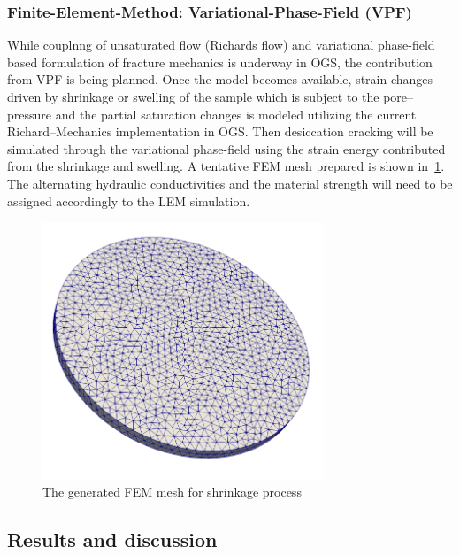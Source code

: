 

\subsubsection*{Finite-Element-Method: Variational-Phase-Field (VPF)}
While couplnng of unsaturated flow (Richards flow) and variational phase-field based formulation of fracture mechanics is underway in OGS, the contribution from VPF is being planned. 
Once the model becomes available, strain changes driven by shrinkage or swelling of the sample which is subject to the pore--pressure and the partial saturation changes is modeled utilizing the current Richard--Mechanics implementation in OGS. Then desiccation cracking will be simulated through the variational phase-field using the strain energy contributed from the shrinkage and swelling.
A tentative FEM mesh prepared is shown in~\ref{fig:ME5_VPF_setup}.
The alternating hydraulic conductivities and the material strength will need to be assigned accordingly to the LEM simulation.

\begin{figure}[!ht]
\centering
\includegraphics[width=0.75\textwidth]{figures/ME5_VPF_mesh.png}
\caption{The generated FEM mesh for shrinkage process}
\label{fig:ME5_VPF_setup}
\end{figure} 
\subsection{Results and discussion}

